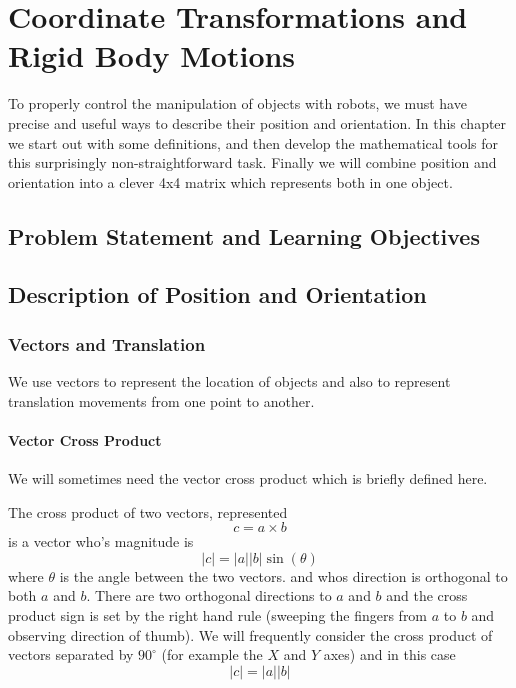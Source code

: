 %

\chapter{Coordinate Transformations and Rigid Body Motions}

To properly control the manipulation of objects with robots, we must have precise and useful ways to describe their position and orientation.  In this chapter we start out with some definitions, and then develop the mathematical tools for this surprisingly non-straightforward task.   Finally we will combine position and orientation into a clever 4x4 matrix which represents both in one object.

\section{Problem Statement and Learning Objectives}



\section{Description of Position and Orientation}

\subsection{Vectors and Translation}

We use vectors to represent the location of objects and also to represent translation movements from one point to another.


%
\subsubsection{Vector Cross Product}
We will sometimes need the vector cross product which is briefly defined here.

The cross product of two vectors, represented
\[
c = a \times b
\]
is a vector who's magnitude is
\[
|c| = |a||b|\sin(\theta)
\]
where $\theta$ is the angle between the two vectors.
and whos direction is orthogonal to both $a$ and $b$.  There are two orthogonal directions to $a$ and $b$ and the cross product sign is set by the right hand rule (sweeping the fingers from $a$ to $b$ and observing direction of thumb).   We will frequently consider the cross product of vectors separated by $90^\circ$ (for example the $X$ and $Y$ axes) and in this case
\[
|c| = |a||b|
\]

